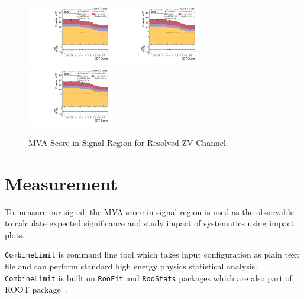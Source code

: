 \begin{figure}[!ht]
  \centering
  \includegraphics[width=0.335\textwidth]{analysis_plots/2016_zjj/sr_l/mva_score_zjj_var2_log.pdf} \hspace{-10pt}
  \includegraphics[width=0.335\textwidth]{analysis_plots/2017_zjj/sr_l/mva_score_zjj_var2_log.pdf} \hspace{-10pt}
  \includegraphics[width=0.335\textwidth]{analysis_plots/2018_zjj/sr_l/mva_score_zjj_var2_log.pdf} \hspace{-10pt} \\
  \caption[MVA Score in Signal Region for Resolved ZV Channel]%
  {MVA Score in Signal Region for Resolved ZV Channel.}%
  \label{fig:zjj-sr-l-mva-score}
\end{figure}


\section{
  Measurement
 }

To measure our signal,
the \gls{MVA} score in signal region is used as the observable to
calculate expected significance and study impact of systematics
using impact plots.

\verb|CombineLimit| is command line tool which takes input
configuration as plain text file and can perform
standard high energy physics statistical analysis. \verb|CombineLimit|
is built on \verb|RooFit| and \verb|RooStats| packages which
are also part of ROOT package~\cite{Verkerke2003,Moneta2010}.

